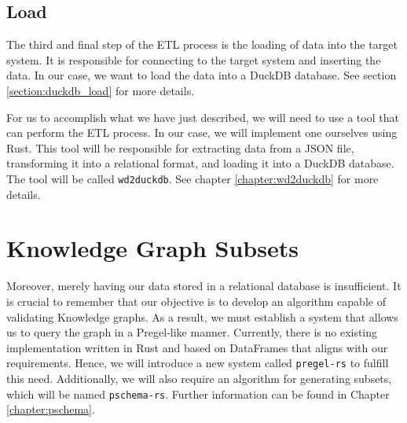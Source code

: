 \subsection{Load}

The third and final step of the ETL process is the loading of data into the target system. It is responsible for connecting to the target system and inserting the data. In our case, we want to load the data into a DuckDB database. See section \ref{section:duckdb_load} for more details.

For us to accomplish what we have just described, we will need to use a tool that can perform the ETL process. In our case, we will implement one ourselves using Rust. This tool will be responsible for extracting data from a JSON file, transforming it into a relational format, and loading it into a DuckDB database. The tool will be called \texttt{wd2duckdb}. See chapter \ref{chapter:wd2duckdb} for more details.

\section{Knowledge Graph Subsets}

Moreover, merely having our data stored in a relational database is insufficient. It is crucial to remember that our objective is to develop an algorithm capable of validating Knowledge graphs. As a result, we must establish a system that allows us to query the graph in a Pregel-like manner. Currently, there is no existing implementation written in Rust and based on DataFrames that aligns with our requirements. Hence, we will introduce a new system called \texttt{pregel-rs} to fulfill this need. Additionally, we will also require an algorithm for generating subsets, which will be named \texttt{pschema-rs}. Further information can be found in Chapter \ref{chapter:pschema}.